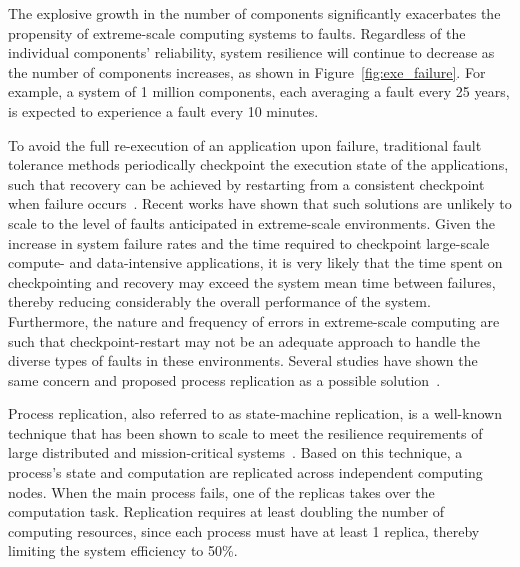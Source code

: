 The explosive growth in the number of components significantly exacerbates the propensity of extreme-scale 
computing systems to faults. %
Regardless of the individual components' reliability, system
resilience will continue to decrease as the number of components increases, as shown in Figure~\ref{fig:exe_failure}. For example, a 
system of 1 million components, each averaging a fault every 25 years, is expected to experience a 
fault every 10 minutes.

To avoid the full 
re-execution of an application upon failure, traditional fault tolerance methods periodically checkpoint
the execution state of the applications, such that recovery
can be achieved by restarting from a consistent checkpoint when failure occurs~\cite{kalaiselvi_sadhana_2000}. 
Recent works \cite{mills_2014_icnc,riesen_sandia_2010} have shown that such solutions are unlikely to scale to the level of faults 
anticipated in extreme-scale environments. Given the increase in system failure rates and the time 
required to checkpoint large-scale compute- and data-intensive applications, it is very likely
that the time spent on checkpointing and recovery
may exceed the system mean time between failures, %
thereby reducing considerably the overall performance of the
system. %
Furthermore, the nature and frequency of errors in extreme-scale computing are such that
checkpoint-restart may not be an adequate approach to handle the diverse types of faults in
these environments. 
Several studies have shown the same concern and proposed process replication as a
possible solution~\cite{fiala_2012_sdc,riesen_sandia_2010}. 

Process replication, also referred to as state-machine replication, is a well-known technique that has been 
shown to scale to meet the resilience requirements of large distributed and mission-critical systems~\cite{schneider_1990_tutorial}.
Based on this technique, a process's state and computation are replicated across independent computing
nodes. When the main process fails, one of the replicas takes over the computation task. Replication 
requires at least doubling the number of computing resources, since each process must have at least 1 replica, thereby 
limiting the system efficiency to 50\%. %

